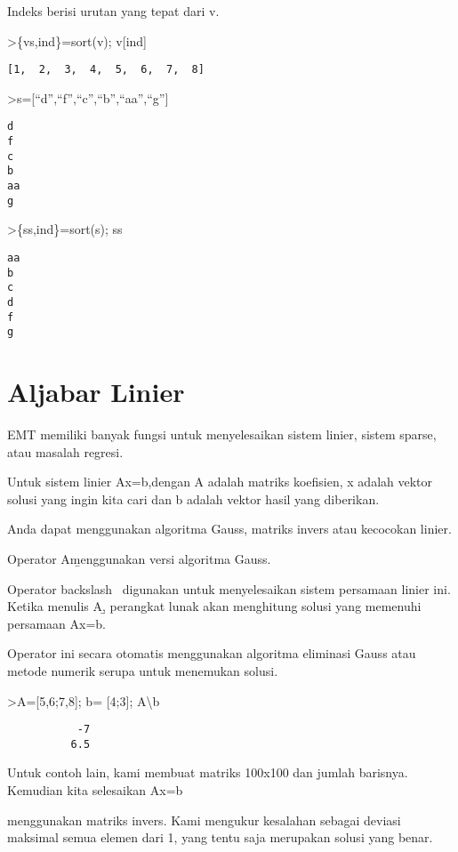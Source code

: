 \documentclass[
]{book}
\begin{document}
Indeks berisi urutan yang tepat dari v.

\textgreater\{vs,ind\}=sort(v); v{[}ind{]}

\begin{verbatim}
[1,  2,  3,  4,  5,  6,  7,  8]
\end{verbatim}

\textgreater s={[}``d'',``f'',``c'',``b'',``aa'',``g''{]}

\begin{verbatim}
d
f
c
b
aa
g
\end{verbatim}

\textgreater\{ss,ind\}=sort(s); ss

\begin{verbatim}
aa
b
c
d
f
g
\end{verbatim}

\chapter{Aljabar Linier}\label{aljabar-linier}

EMT memiliki banyak fungsi untuk menyelesaikan sistem linier, sistem sparse, atau masalah regresi.

Untuk sistem linier Ax=b,dengan A adalah matriks koefisien, x adalah vektor solusi yang ingin kita cari dan b adalah vektor hasil yang diberikan.

Anda dapat menggunakan algoritma Gauss, matriks invers atau kecocokan linier.

Operator A\b menggunakan versi algoritma Gauss.

Operator backslash ~digunakan untuk menyelesaikan sistem persamaan linier ini. Ketika menulis A\b, perangkat lunak akan menghitung solusi yang memenuhi persamaan Ax=b.

Operator ini secara otomatis menggunakan algoritma eliminasi Gauss atau metode numerik serupa untuk menemukan solusi.

\textgreater A={[}5,6;7,8{]}; b= {[}4;3{]}; A\textbackslash b

\begin{verbatim}
           -7 
          6.5 
\end{verbatim}

Untuk contoh lain, kami membuat matriks 100x100 dan jumlah barisnya. Kemudian kita selesaikan Ax=b

menggunakan matriks invers. Kami mengukur kesalahan sebagai deviasi maksimal semua elemen dari 1, yang tentu saja merupakan solusi yang benar.
\end{document}
